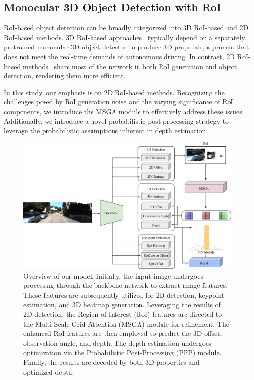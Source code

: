 \documentclass[journal]{IEEEtran}
\begin{document}
	\subsection{Monocular 3D Object Detection with RoI}
	
	RoI-based object detection can be broadly categorized into 3D RoI-based and 2D RoI-based methods. 3D RoI-based approaches~\cite{neurocs, monoxiver} typically depend on a separately pretrained monocular 3D object detector to produce 3D proposals, a process that does not meet the real-time demands of autonomous driving. In contrast, 2D RoI-based methods~\cite{roi10d, didm3d, gupnet, gupnet++} share most of the network in both RoI generation and object detection, rendering them more efficient.
	
	In this study, our emphasis is on 2D RoI-based methods. Recognizing the challenges posed by RoI generation noise and the varying significance of RoI components, we introduce the MSGA module to effectively address these issues. Additionally, we introduce a novel probabilistic post-processing strategy to leverage the probabilistic assumptions inherent in depth estimation.
	\begin{figure}[!t]
		\centering
		\includegraphics[width=1.0\linewidth]{Figures/overview/overview.eps}
		\caption{Overview of our model. Initially, the input image undergoes processing through the backbone network to extract image features. These features are subsequently utilized for 2D detection, keypoint estimation, and 3D heatmap generation. Leveraging the results of 2D detection, the Region of Interest (RoI) features are directed to the Multi-Scale Grid Attention (MSGA) module for refinement. The enhanced RoI features are then employed to predict the 3D offset, observation angle, and depth. The depth estimation undergoes optimization via the Probabilistic Post-Processing (PPP) module. Finally, the results are decoded by both 3D properties and optimized depth.}
		\label{fig:overview}
	\end{figure}
	
\end{document}
